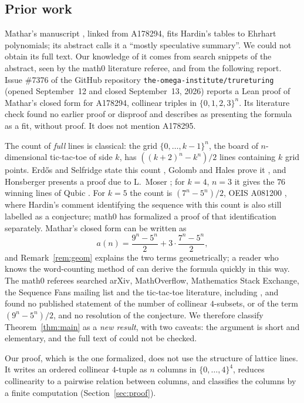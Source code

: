 \documentclass[11pt]{amsart}
\theoremstyle{plain}
\theoremstyle{definition}
\begin{document}
\subsection*{Prior work}
Mathar's manuscript \cite{Ma}, linked from A178294, fits Hardin's tables to Ehrhart polynomials; its abstract calls it a ``mostly speculative summary''. We could not obtain its full text. Our knowledge of it comes from search snippets of the abstract, seen by the math0 literature referee, and from the following report.
Issue \#7376 of the GitHub repository \texttt{the-omega-institute/trureturing} \cite{TRU} (opened September~12 and closed September~13, 2026) reports a Lean proof of Mathar's closed form for A178294, collinear triples in $\{0,1,2,3\}^n$. Its literature check found no earlier proof or disproof and describes \cite{Ma} as presenting the formula as a fit, without proof. It does not mention A178295.

The count of \emph{full} lines is classical: the grid $\{0,\dots,k-1\}^n$, the board of $n$-dimensional tic-tac-toe of side $k$, has $((k+2)^n-k^n)/2$ lines containing $k$ grid points. Erd\H{o}s and Selfridge state this count \cite{ES}, Golomb and Hales prove it \cite[Theorem~1]{GH}, and Honsberger presents a proof due to L.~Moser \cite{Ho}; for $k=4$, $n=3$ it gives the $76$ winning lines of Qubic \cite{Pa}. For $k=5$ the count is $(7^n-5^n)/2$, OEIS A081200 \cite{A081200}, where Hardin's comment identifying the sequence with this count is also still labelled as a conjecture; math0 has formalized a proof of that identification separately. Mathar's closed form can be written as
\[
  a(n)=\frac{9^n-5^n}{2}+3\cdot\frac{7^n-5^n}{2},
\]
and Remark~\ref{rem:geom} explains the two terms geometrically; a reader who knows the word-counting method of \cite{GH} can derive the formula quickly in this way. The math0 referees searched arXiv, MathOverflow, Mathematics Stack Exchange, the Sequence Fans mailing list and the tic-tac-toe literature, including \cite{GH}, and found no published statement of the number of collinear $4$-subsets, or of the term $(9^n-5^n)/2$, and no resolution of the conjecture. We therefore classify Theorem~\ref{thm:main} as a \emph{new result}, with two caveats: the argument is short and elementary, and the full text of \cite{Ma} could not be checked.

Our proof, which is the one formalized, does not use the structure of lattice lines. It writes an ordered collinear $4$-tuple as $n$ columns in $\{0,\dots,4\}^4$, reduces collinearity to a pairwise relation between columns, and classifies the columns by a finite computation (Section~\ref{sec:proof}).
\end{document}
